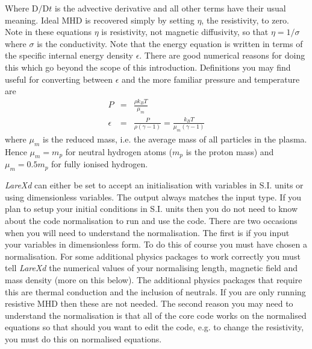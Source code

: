 \documentclass[11pt]{article}
\begin{document}
Where $\mathrm{D}/\mathrm{D}t$ is the advective derivative and all other terms have their usual meaning. Ideal MHD is recovered simply by setting $\eta$, the resistivity, to zero. Note in these equations $\eta$ is resistivity, not magnetic diffusivity, so that $\eta=1/\sigma$ where $\sigma$ is the conductivity. Note that the energy equation is written in terms of the specific internal energy density $\epsilon$. There are good numerical reasons for doing this which go beyond the scope of this introduction. Definitions you may find useful for converting between $\epsilon$ and the more familiar pressure and temperature are
\begin{eqnarray*}
P&=&\frac{\rho k_{B}T}{\mu_m}\\
\epsilon&=&\frac{P}{\rho(\gamma-1)}=\frac{k_B T}{\mu_m (\gamma-1)}
\end{eqnarray*}
where $\mu_m$ is the reduced mass, i.e. the average mass of all particles in the plasma. Hence $\mu_m=m_p$ for neutral hydrogen atoms ($m_p$ is the proton mass) and $\mu_m=0.5 m_p$ for fully ionised hydrogen. 

 {\it LareXd} can either be set to accept an initialisation with variables in S.I. units or using dimensionless variables. The output always matches the input type. If you plan to setup your initial conditions in S.I. units then you do not need to know about the code normalisation to run and use the code. There are two occasions when you will need to understand the normalisation. The first is if you input your variables in dimensionless form. To do this of course you must have chosen a normalisation. For some additional physics packages to work correctly you must tell {\it LareXd} the numerical values of your normalising length, magnetic field and mass density (more on this below). The additional physics packages that require this are thermal conduction and the inclusion of neutrals. If you are only running resistive MHD then these are not needed. The second reason you may need to understand the normalisation is that all of the core code works on the normalised equations so that should you want to edit the code, e.g. to change the resistivity, you must do this on normalised equations.  
 
\end{document}
